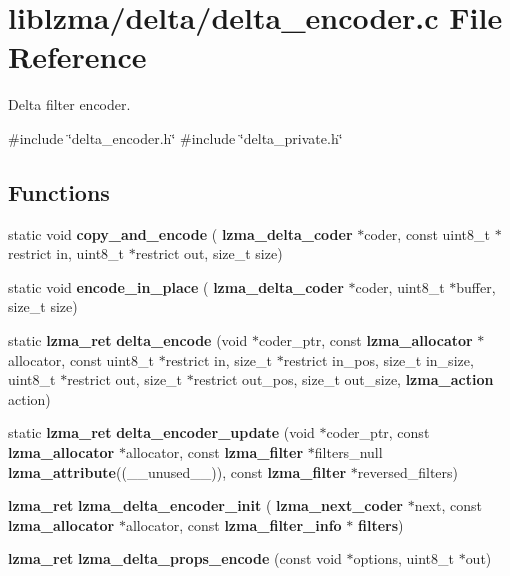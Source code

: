 \section{liblzma/delta/delta\+\_\+encoder.c File Reference}
\label{delta__encoder_8c}


Delta filter encoder.  


{\ttfamily \#include \char`\"{}delta\+\_\+encoder.\+h\char`\"{}}\newline
{\ttfamily \#include \char`\"{}delta\+\_\+private.\+h\char`\"{}}\newline
\subsection*{Functions}
\begin{DoxyCompactItemize}
\item 
static void \textbf{ copy\+\_\+and\+\_\+encode} (\textbf{ lzma\+\_\+delta\+\_\+coder} $\ast$coder, const uint8\+\_\+t $\ast$restrict in, uint8\+\_\+t $\ast$restrict out, size\+\_\+t size)
\item 
static void \textbf{ encode\+\_\+in\+\_\+place} (\textbf{ lzma\+\_\+delta\+\_\+coder} $\ast$coder, uint8\+\_\+t $\ast$buffer, size\+\_\+t size)
\item 
\mbox{\label{delta__encoder_8c_a2f9f9d796b70c4bc87ab7541f4856bc1}} 
static \textbf{ lzma\+\_\+ret} {\bfseries delta\+\_\+encode} (void $\ast$coder\+\_\+ptr, const \textbf{ lzma\+\_\+allocator} $\ast$allocator, const uint8\+\_\+t $\ast$restrict in, size\+\_\+t $\ast$restrict in\+\_\+pos, size\+\_\+t in\+\_\+size, uint8\+\_\+t $\ast$restrict out, size\+\_\+t $\ast$restrict out\+\_\+pos, size\+\_\+t out\+\_\+size, \textbf{ lzma\+\_\+action} action)
\item 
\mbox{\label{delta__encoder_8c_a91a4d2febd5040799a2dbe08ac8794a2}} 
static \textbf{ lzma\+\_\+ret} {\bfseries delta\+\_\+encoder\+\_\+update} (void $\ast$coder\+\_\+ptr, const \textbf{ lzma\+\_\+allocator} $\ast$allocator, const \textbf{ lzma\+\_\+filter} $\ast$filters\+\_\+null \textbf{ lzma\+\_\+attribute}((\+\_\+\+\_\+unused\+\_\+\+\_\+)), const \textbf{ lzma\+\_\+filter} $\ast$reversed\+\_\+filters)
\item 
\mbox{\label{delta__encoder_8c_af5ccd3ca86784025440893bc9867a208}} 
\textbf{ lzma\+\_\+ret} {\bfseries lzma\+\_\+delta\+\_\+encoder\+\_\+init} (\textbf{ lzma\+\_\+next\+\_\+coder} $\ast$next, const \textbf{ lzma\+\_\+allocator} $\ast$allocator, const \textbf{ lzma\+\_\+filter\+\_\+info} $\ast$\textbf{ filters})
\item 
\mbox{\label{delta__encoder_8c_aeac2126d3a2fc0ab4e32a0d3b0e0fc9e}} 
\textbf{ lzma\+\_\+ret} {\bfseries lzma\+\_\+delta\+\_\+props\+\_\+encode} (const void $\ast$options, uint8\+\_\+t $\ast$out)
\end{DoxyCompactItemize}


